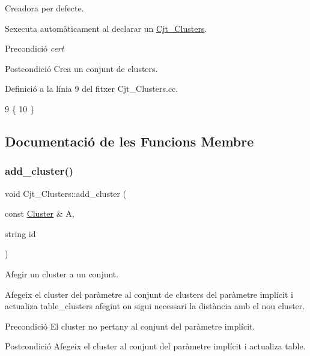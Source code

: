 Creadora per defecte. 

S\textquotesingle{}executa automàticament al declarar un \hyperlink{class_cjt___clusters}{Cjt\+\_\+\+Clusters}.

\begin{DoxyPrecond}{Precondició}
{\itshape cert} 
\end{DoxyPrecond}
\begin{DoxyPostcond}{Postcondició}
Crea un conjunt de clusters. 
\end{DoxyPostcond}


Definició a la línia 9 del fitxer Cjt\+\_\+\+Clusters.\+cc.


\begin{DoxyCode}
9                            \{
10 \}
\end{DoxyCode}


\subsection{Documentació de les Funcions Membre}
\mbox{\label{class_cjt___clusters_ace64164c455de6b3e91b774ad95d93ac}} 
\subsubsection{\texorpdfstring{add\+\_\+cluster()}{add\_cluster()}}
{\footnotesize\ttfamily void Cjt\+\_\+\+Clusters\+::add\+\_\+cluster (\begin{DoxyParamCaption}\item[{const \hyperlink{class_cluster}{Cluster} \&}]{A,  }\item[{string}]{id }\end{DoxyParamCaption})}



Afegir un cluster a un conjunt. 

Afegeix el cluster del paràmetre al conjunt de clusters del paràmetre implícit i actualiza table\+\_\+clusters afegint on sigui necessari la distància amb el nou cluster.

\begin{DoxyPrecond}{Precondició}
El cluster no pertany al conjunt del paràmetre implícit. 
\end{DoxyPrecond}
\begin{DoxyPostcond}{Postcondició}
Afegeix el cluster al conjunt del paràmetre implícit i actualiza table. 
\end{DoxyPostcond}


